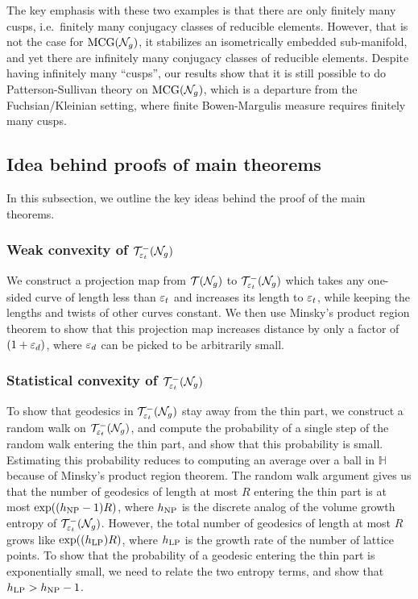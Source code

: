 The key emphasis with these two examples is that there are only finitely many cusps, i.e.\ finitely many conjugacy classes of reducible elements.
However, that is not the case for $\mathrm{MCG}(\mathcal{N}_g)$, it stabilizes an isometrically embedded sub-manifold, and yet there are infinitely many conjugacy classes of reducible elements.
Despite having infinitely many ``cusps'', our results show that it is still possible to do Patterson-Sullivan theory on $\mathrm{MCG}(\mathcal{N}_g)$, which is a departure from the Fuchsian/Kleinian setting, where finite Bowen-Margulis measure requires finitely many cusps.


\subsection*{Idea behind proofs of main theorems}

In this subsection, we outline the key ideas behind the proof of the main theorems.

\subsubsection*{Weak convexity of $\mathcal{T}_{\varepsilon_t}^{-}(\mathcal{N}_g)$}
We construct a projection map from $\mathcal{T}(\mathcal{N}_g)$ to $\mathcal{T}_{\varepsilon_t}^{-}(\mathcal{N}_g)$ which takes any one-sided curve of length less than $\varepsilon_t$ and increases its length to $\varepsilon_t$, while keeping the lengths and twists of other curves constant.
We then use Minsky's product region theorem to show that this projection map increases distance by only a factor of $(1 + \varepsilon_d)$, where $\varepsilon_d$ can be picked to be arbitrarily small.

\subsubsection*{Statistical convexity of $\mathcal{T}_{\varepsilon_t}^{-}(\mathcal{N}_g)$}
To show that geodesics in $\mathcal{T}_{\varepsilon_t}^{-}(\mathcal{N}_g)$ stay away from the thin part, we construct a random walk on $\mathcal{T}_{\varepsilon_t}^{-}(\mathcal{N}_g)$, and compute the probability of a single step of the random walk entering the thin part, and show that this probability is small.
Estimating this probability reduces to computing an average over a ball in $\mathbb{H}$ because of Minsky's product region theorem.
The random walk argument gives us that the number of geodesics of length at most $R$ entering the thin part is at most $\exp((h_{\mathrm{NP}} - 1)R)$, where $h_{\mathrm{NP}}$ is the discrete analog of the volume growth entropy of $\mathcal{T}_{\varepsilon_t}^{-}(\mathcal{N}_g)$.
However, the total number of geodesics of length at most $R$ grows like $\exp((h_{\mathrm{LP}})R)$, where $h_{\mathrm{LP}}$ is the growth rate of the number of lattice points.
To show that the probability of a geodesic entering the thin part is exponentially small, we need to relate the two entropy terms, and show that $h_{\mathrm{LP}} > h_{\mathrm{NP}} - 1$.

